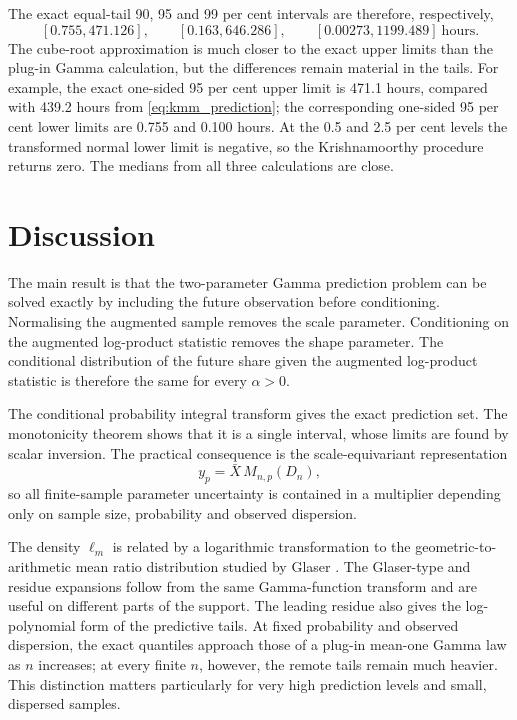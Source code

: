 \documentclass[11pt]{article}
\theoremstyle{remark}
\begin{document}
The exact equal-tail 90, 95 and 99 per cent intervals are therefore, respectively,
\[
 [0.755,471.126],\qquad
 [0.163,646.286],\qquad
 [0.00273,1199.489]\ \text{hours}.
\]
The cube-root approximation is much closer to the exact upper limits than the plug-in Gamma calculation, but the differences remain material in the tails. For example, the exact one-sided 95 per cent upper limit is 471.1 hours, compared with 439.2 hours from \eqref{eq:kmm_prediction}; the corresponding one-sided 95 per cent lower limits are 0.755 and 0.100 hours. At the 0.5 and 2.5 per cent levels the transformed normal lower limit is negative, so the Krishnamoorthy procedure returns zero. The medians from all three calculations are close.

\section{Discussion}

The main result is that the two-parameter Gamma prediction problem can be solved exactly by including the future observation before conditioning. 
Normalising the augmented sample removes the scale parameter. Conditioning on the augmented log-product statistic removes the shape parameter. The conditional distribution of the future share given the augmented log-product statistic is therefore the same for every $\alpha>0$.

The conditional probability integral transform gives the exact prediction set. The monotonicity theorem shows that it is a single interval, whose limits are found by scalar inversion. The practical consequence is the scale-equivariant representation
\[
 y_p=\bar X\,M_{n,p}(D_n),
\]
so all finite-sample parameter uncertainty is contained in a multiplier depending only on sample size, probability and observed dispersion.

The density $\ell_m$ is related by a logarithmic transformation to the geometric-to-arithmetic mean ratio distribution studied by Glaser \cite{Glaser1976}. The Glaser-type and residue expansions follow from the same Gamma-function transform and are useful on different parts of the support. The leading residue also gives the log-polynomial form of the predictive tails. At fixed probability and observed dispersion, the exact quantiles approach those of a plug-in mean-one Gamma law as $n$ increases; at every finite $n$, however, the remote tails remain much heavier. This distinction matters particularly for very high prediction levels and small, dispersed samples.
\end{document}
